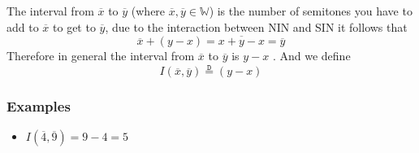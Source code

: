 \documentclass[preview]{standalone}
\begin{document}
\begin{center}
The interval from  $ \overline{x}$ to $ \overline{y }$ (where $ \overline{x}, \overline{y} \in \mathbb{W}$) is the number of semitones you have to add to $ \overline{x}$ to get to $ \overline{y}$, due to the interaction between NIN and SIN it follows that 
              \[
                \overline{x}  +  \left( y  -  x \right) = \overline{x  +  y  -  x} = \overline{y}
              \]
              Therefore in general the interval from $ \overline{x}$  to $ \overline{y}$ is $y  - x$ . And we define 
              \[
                I\left( \overline{x}, \overline{y}\right) \stackrel{\mathtt{D}}{=} (y  -  x) 
              \]
              \subsubsection*{Examples}
              \begin{itemize}
                \item $I\left( \overline{4}, \overline{9}\right) = 9  -  4 = 5$ 
              \end{itemize}
\end{center}
\end{document}
